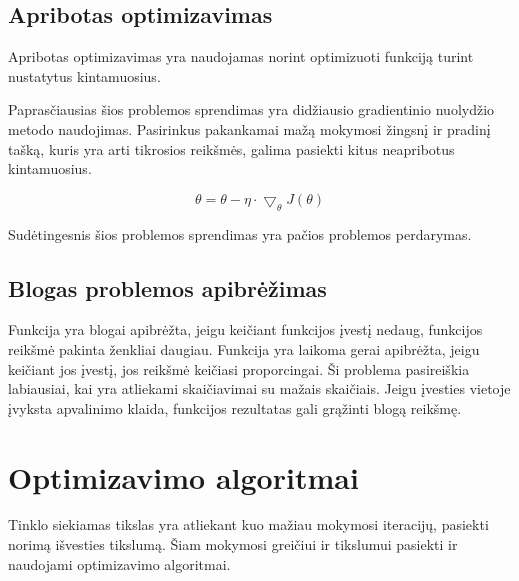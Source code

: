 \documentclass{VUMIFInfKursinis}
\begin{document}
\subsection{Apribotas optimizavimas}
Apribotas optimizavimas yra naudojamas norint optimizuoti funkciją
turint nustatytus kintamuosius.\cite{salt7}
\par
Paprasčiausias šios problemos sprendimas yra didžiausio gradientinio nuolydžio
metodo naudojimas. Pasirinkus pakankamai mažą mokymosi žingsnį ir pradinį tašką, kuris
yra arti tikrosios reikšmės, galima pasiekti kitus neapribotus kintamuosius.

\[
\theta = \theta - \eta \cdot \bigtriangledown_{\theta}J(\theta)
\]

\par
Sudėtingesnis šios problemos sprendimas yra pačios problemos perdarymas. \cite{salt7}

\subsection{Blogas problemos apibrėžimas}

Funkcija yra blogai apibrėžta, jeigu keičiant funkcijos įvestį nedaug, funkcijos reikšmė
pakinta ženkliai daugiau. Funkcija yra laikoma gerai apibrėžta, jeigu keičiant jos įvestį,
jos reikšmė keičiasi proporcingai. Ši problema pasireiškia labiausiai, kai yra
atliekami skaičiavimai su mažais skaičiais. Jeigu įvesties vietoje įvyksta apvalinimo
klaida, funkcijos rezultatas gali grąžinti blogą reikšmę. \cite{salt7}









\section{Optimizavimo algoritmai}
\par
Tinklo siekiamas tikslas yra atliekant kuo mažiau mokymosi iteracijų, pasiekti norimą
išvesties tikslumą. Šiam mokymosi greičiui ir tikslumui pasiekti ir naudojami
optimizavimo algoritmai.
\end{document}

